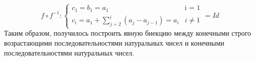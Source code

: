 \documentclass{article}
\begin{document}
 \begin{equation*}
f \circ f^{-1} : 
 \begin{cases}
   c_{\textit{1}} = b_{\textit{1}} = a_{\textit{1}} &\text{i = 1}\\
   c_{\textit{i}} = a_1+ \sum\nolimits_{j=2}^i (a_j-a_{j-1}) = a_i &\text{$i \neq 1$}
 \end{cases}
 =Id
\end{equation*}
 Таким образом, получилось построить явную биекцию между конечными строго возрастающими последовательностями натуральных чисел и конечными последовательностями натуральных чисел.
\end{document}
